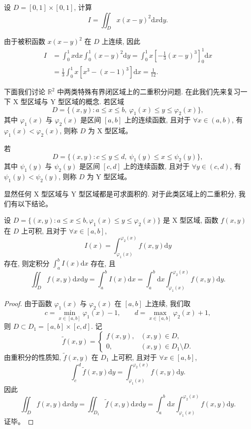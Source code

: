 \documentclass[UTF8,12pt,a4paper,fontset=fandol]{ctexart}
\begin{document}
\begin{example}\label{course-example-15-3-1}\quad 设 $D=[0,1]\times[0,1]$, 计算
\[
  I=\iint_D x(x-y)^2\mathrm dx\mathrm dy.
\]

\end{example}
\begin{solve}\quad 由于被积函数 $x(x-y)^2$ 在 $D$ 上连续, 因此
\[
\begin{aligned}
  I
  &=\int_0^1 x\mathrm dx\int_0^1(x-y)^2\mathrm dy
    =\int_0^1 x\left[-\frac13(x-y)^3\right]_0^1\mathrm dx\\
  &=\frac13\int_0^1x[x^3-(x-1)^3]\mathrm dx
    =\frac1{12}.
\end{aligned}
\]

下面我们讨论 $\mathbb R^2$ 中两类特殊有界闭区域上的二重积分问题. 在此我们先来复习一下 X 型区域与 Y 型区域的概念. 若区域
\[
  D=\{(x,y):a\leqslant x\leqslant b,\ \varphi_1(x)\leqslant y\leqslant\varphi_2(x)\},
\]
其中 $\varphi_1(x)$ 与 $\varphi_2(x)$ 是区间 $[a,b]$ 上的连续函数, 且对于 $\forall x\in(a,b)$, 有 $\varphi_1(x)<\varphi_2(x)$, 则称 $D$ 为 X 型区域。

若
\[
  D=\{(x,y):c\leqslant y\leqslant d,\ \psi_1(y)\leqslant x\leqslant\psi_2(y)\},
\]
其中 $\psi_1(y)$ 与 $\psi_2(y)$ 是区间 $[c,d]$ 上的连续函数, 且对于 $\forall y\in(c,d)$, 有 $\psi_1(y)<\psi_2(y)$, 则称 $D$ 为 Y 型区域。

显然任何 X 型区域与 Y 型区域都是可求面积的. 对于此类区域上的二重积分, 我们有以下结论。

\end{solve}
\begin{theorem}\label{course-theorem-15-3-2}\quad 设 $D=\{(x,y):a\leqslant x\leqslant b,\varphi_1(x)\leqslant y\leqslant\varphi_2(x)\}$ 是 X 型区域, 函数 $f(x,y)$ 在 $D$ 上可积, 且对于 $\forall x\in[a,b]$,
\[
  I(x)=\int_{\varphi_1(x)}^{\varphi_2(x)}f(x,y)\mathrm dy
\]
存在, 则定积分 $\int_a^b I(x)\mathrm dx$ 存在, 且
\begin{equation}
  \iint_D f(x,y)\mathrm dx\mathrm dy
  =\int_a^b I(x)\mathrm dx
  =\int_a^b\mathrm dx\int_{\varphi_1(x)}^{\varphi_2(x)}f(x,y)\mathrm dy.
  \label{course-eq-15-3-1}
\end{equation}

\end{theorem}
\begin{proof}\quad 由于函数 $\varphi_1(x)$ 与 $\varphi_2(x)$ 在 $[a,b]$ 上连续, 我们取
\[
  c=\min_{x\in[a,b]}\varphi_1(x)-1,\qquad
  d=\max_{x\in[a,b]}\varphi_2(x)+1,
\]
则 $D\subset D_1=[a,b]\times[c,d]$. 记
\[
  \tilde f(x,y)=
  \begin{cases}
    f(x,y), & (x,y)\in D,\\
    0, & (x,y)\in D_1\setminus D.
  \end{cases}
\]
由重积分的性质知, $\tilde f(x,y)$ 在 $D_1$ 上可积, 且对于 $\forall x\in[a,b]$,
\[
  \int_c^d\tilde f(x,y)\mathrm dy
  =\int_{\varphi_1(x)}^{\varphi_2(x)}f(x,y)\mathrm dy.
\]
因此
\[
  \iint_D f(x,y)\mathrm dx\mathrm dy
  =\iint_{D_1}\tilde f(x,y)\mathrm dx\mathrm dy
  =\int_a^b\mathrm dx\int_{\varphi_1(x)}^{\varphi_2(x)}f(x,y)\mathrm dy.
\]
证毕。

\end{proof}
\end{document}

